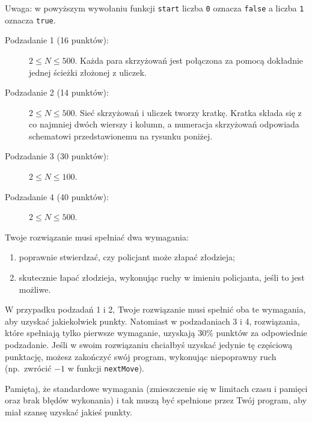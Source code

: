 \documentclass{boi2014-pl}
\renewcommand{\method}[1]{{\tt #1}}
\newcommand{\constant}[1]{{\tt #1}}
\begin{document}
    Uwaga: w powyższym wywołaniu funkcji \method{start} liczba \constant{0} oznacza
    \constant{false} a liczba \constant{1} oznacza \constant{true}.

    \Scoring
    \begin{description}
        \item[Podzadanie 1 (16 punktów):] $2 \le N \le 500$. Każda para skrzyżowań jest połączona za pomocą dokładnie jednej ścieżki złożonej z uliczek.
        \item[Podzadanie 2 (14 punktów):] $2 \le N \le 500$. Sieć skrzyżowań i uliczek tworzy kratkę.
        Kratka składa się z co najmniej dwóch wierszy i kolumn, a numeracja skrzyżowań
        odpowiada schematowi przedstawionemu na rysunku poniżej.
        \begin{figure}[h!]
           \centering
        \end{figure}
        \item[Podzadanie 3 (30 punktów):] $2 \le N \le 100$.
        \item[Podzadanie 4 (40 punktów):] $2 \le N \le 500$.
    \end{description}

    Twoje rozwiązanie musi spełniać dwa wymagania:
    \begin{enumerate}
      \item poprawnie stwierdzać, czy policjant może złapać złodzieja;
      \item skutecznie łapać złodzieja, wykonując ruchy w imieniu policjanta, jeśli
        to jest możliwe.
    \end{enumerate}

    W przypadku podzadań 1 i 2, Twoje rozwiązanie musi spełnić oba te wymagania, aby
    uzyskać jakiekolwiek punkty.
    Natomiast w podzadaniach 3 i 4, rozwiązania, które spełniają tylko pierwsze
    wymaganie, uzyskają 30\% punktów za odpowiednie podzadanie.
    Jeśli w swoim rozwiązaniu chciałbyś uzyskać jedynie tę częściową punktację,
    możesz zakończyć swój program, wykonując niepoprawny ruch 
    (np.\ zwrócić $-1$ w funkcji \method{nextMove}).

    Pamiętaj, że standardowe wymagania (zmieszczenie się w limitach czasu i pamięci
    oraz brak błędów wykonania) i tak muszą być spełnione przez Twój program, aby miał
    szansę uzyskać jakieś punkty.
\end{document}
